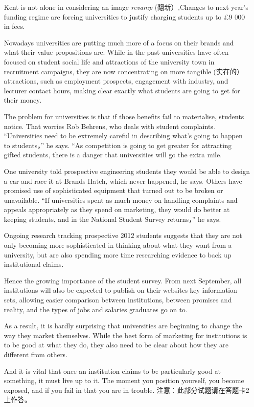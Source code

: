 \documentclass[UTF8,11pt]{ctexart}
\begin{document}
Kent is not alone in considering an image\textit{ revamp} (翻新）,Changes to next year’s funding regime are forcing universities to justify charging students up to £9 000 in fees.


Nowadays universities are putting much more of a focus on their brands and what their value propositions are. While in the past universities have often focused on student social life and attractions of the university town in recruitment campaigns, they are now concentrating on more tangible (实在的）attractions, such as employment prospects, engagement with industry, and lecturer contact hours, making clear exactly what students are going to get for their money.


The problem for universities is that if those benefits fail to materialise, students notice. That worries Rob Behrens, who deals with student complaints. “Universities need to be extremely careful in describing what’s going to happen to students，” he says. “As competition is going to get greater for attracting gifted students, there is a danger that universities will go the extra mile.


One university told prospective engineering students they would be able to design a car and race it at Brands Hatch, which never happened, he says. Others have promised use of sophisticated equipment that turned out to be broken or unavailable. “If universities spent as much money on handling complaints and appeals appropriately as they spend on marketing, they would do better at keeping students, and in the National Student Survey returns，” he says.


Ongoing research tracking prospective 2012 students suggests that they are not only becoming more sophisticated in thinking about what they want from a university, but are also spending more time researching evidence to back up institutional claims.


Hence the growing importance of the student survey. From next September, all institutions will also be expected to publish on their websites key information sets, allowing easier comparison between institutions, between promises and reality, and the types of jobs and salaries graduates go on to.


As a result, it is hardly surprising that universities are beginning to change the way they market themselves. While the best form of marketing for institutions is to be good at what they do, they also need to be clear about how they are different from others.


And it is vital that once an institution claims to be particularly good at something, it must live up to it. The moment you position yourself, you become exposed, and if you fail in that you are in trouble. 注意：此部分试题请在答题卡2 上作答。
\end{document}

